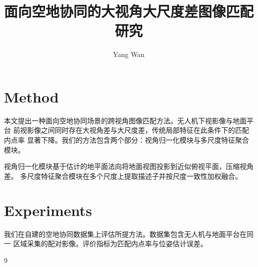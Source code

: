 \documentclass{article}
\title{面向空地协同的大视角大尺度差图像匹配研究}
\author{Yang Wan}
\begin{document}
\maketitle

\section{Method}
本文提出一种面向空地协同场景的跨视角图像匹配方法。无人机下视影像与地面平台
前视影像之间同时存在大视角差与大尺度差，传统局部特征在此条件下的匹配内点率
显著下降。我们的方法包含两个部分：视角归一化模块与多尺度特征聚合模块。

视角归一化模块基于估计的地平面法向将地面视图投影到近似俯视平面，压缩视角差。
多尺度特征聚合模块在多个尺度上提取描述子并按尺度一致性加权融合。

\section{Experiments}
我们在自建的空地协同数据集上评估所提方法。数据集包含无人机与地面平台在同一
区域采集的配对影像。评价指标为匹配内点率与位姿估计误差。

\begin{thebibliography}{9}
\end{thebibliography}
\end{document}

